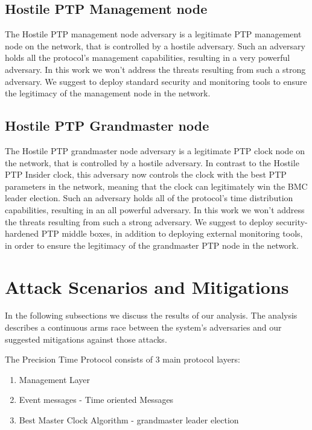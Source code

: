 \documentclass[11pt]{article}
\begin{document}
\subsection{Hostile PTP Management node}\label{adv:tech}

The Hostile PTP management node adversary is a legitimate PTP management node on the network, that is controlled by a hostile adversary. Such an adversary holds all the protocol's management capabilities, resulting in a very powerful adversary. In this work we won't address the threats resulting from such a strong adversary. We suggest to deploy standard security and monitoring tools to ensure the legitimacy of the management node in the network.



\subsection{Hostile PTP Grandmaster node}\label{adv:master}

The Hostile PTP grandmaster node adversary is a legitimate PTP clock node on the network, that is controlled by a hostile adversary. In contrast to the Hostile PTP Insider clock, this adversary now controls the clock with the best PTP parameters in the network, meaning that the clock can legitimately win the BMC leader election. Such an adversary holds all of the protocol's time distribution capabilities, resulting in an all powerful adversary. In this work we won't address the threats resulting from such a strong adversary. We suggest to deploy security-hardened PTP middle boxes, in addition to deploying external monitoring tools, in order to ensure the legitimacy of the grandmaster PTP node in the network.





\section{Attack Scenarios and Mitigations}\label{Attack Scenarios}



In the following subsections we discuss the results of our analysis. The analysis describes a continuous arms race between the system's adversaries and our suggested mitigations against those attacks.



The Precision Time Protocol consists of 3 main protocol layers:

\begin{enumerate}

  \item Management Layer

  \item Event messages - Time oriented Messages

  \item Best Master Clock Algorithm - grandmaster leader election

\end{enumerate}
\end{document}
